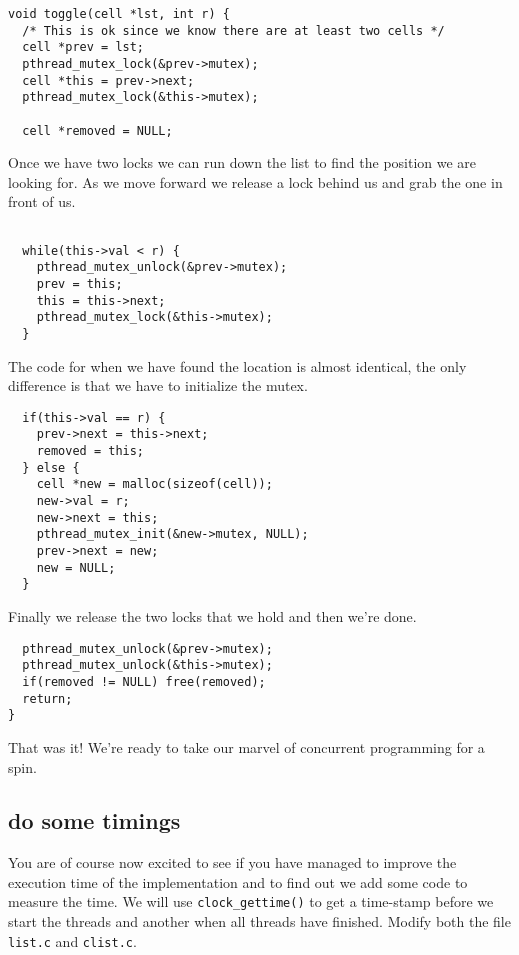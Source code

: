 \documentclass[a4paper,11pt]{article}
\begin{document}
\begin{lstlisting}
void toggle(cell *lst, int r) {
  /* This is ok since we know there are at least two cells */
  cell *prev = lst;
  pthread_mutex_lock(&prev->mutex);  
  cell *this = prev->next;
  pthread_mutex_lock(&this->mutex);

  cell *removed = NULL;
\end{lstlisting}

Once we have two locks we can run down the list to find the position
we are looking for. As we move forward we release a lock behind us and
grab the one in front of us.

  \begin{lstlisting}
  
  while(this->val < r) {
    pthread_mutex_unlock(&prev->mutex);      
    prev = this;
    this = this->next;
    pthread_mutex_lock(&this->mutex);      
  }
  \end{lstlisting}

  The code for when we have found the location is almost identical,
  the only difference is that we have to initialize the mutex.

  \begin{lstlisting}
  if(this->val == r) {
    prev->next = this->next;
    removed = this;
  } else {
    cell *new = malloc(sizeof(cell));
    new->val = r;
    new->next = this;
    pthread_mutex_init(&new->mutex, NULL);
    prev->next = new;
    new = NULL;
  }
  \end{lstlisting}

Finally we release the two locks that we hold and then we're done. 

  \begin{lstlisting}
  pthread_mutex_unlock(&prev->mutex);      
  pthread_mutex_unlock(&this->mutex);      
  if(removed != NULL) free(removed);
  return;
}
\end{lstlisting}

That was it! We're ready to take our marvel of concurrent programming
for a spin.

\subsection{do some timings}

You are of course now excited to see if you have managed to improve
the execution time of the implementation and to find out we add some
code to measure the time. We will use {\tt clock\_gettime()} to get a
time-stamp before we start the threads and another when all threads
have finished. Modify both the file {\tt list.c} and {\tt clist.c}. 
\end{document}

